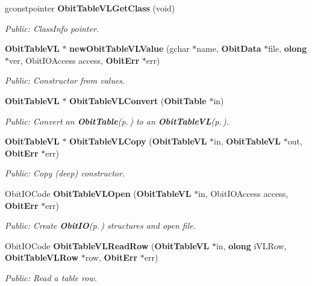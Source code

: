 \begin{CompactItemize}
gconstpointer {\bf Obit\-Table\-VLGet\-Class} (void)
\begin{CompactList}\small\item\em Public: Class\-Info pointer. \item\end{CompactList}\item 
{\bf Obit\-Table\-VL} $\ast$ {\bf new\-Obit\-Table\-VLValue} (gchar $\ast$name, {\bf Obit\-Data} $\ast$file, {\bf olong} $\ast$ver, Obit\-IOAccess access, {\bf Obit\-Err} $\ast$err)
\begin{CompactList}\small\item\em Public: Constructor from values. \item\end{CompactList}\item 
{\bf Obit\-Table\-VL} $\ast$ {\bf Obit\-Table\-VLConvert} ({\bf Obit\-Table} $\ast$in)
\begin{CompactList}\small\item\em Public: Convert an {\bf Obit\-Table}{\rm (p.\,\pageref{structObitTable})} to an {\bf Obit\-Table\-VL}{\rm (p.\,\pageref{structObitTableVL})}. \item\end{CompactList}\item 
{\bf Obit\-Table\-VL} $\ast$ {\bf Obit\-Table\-VLCopy} ({\bf Obit\-Table\-VL} $\ast$in, {\bf Obit\-Table\-VL} $\ast$out, {\bf Obit\-Err} $\ast$err)
\begin{CompactList}\small\item\em Public: Copy (deep) constructor. \item\end{CompactList}\item 
Obit\-IOCode {\bf Obit\-Table\-VLOpen} ({\bf Obit\-Table\-VL} $\ast$in, Obit\-IOAccess access, {\bf Obit\-Err} $\ast$err)
\begin{CompactList}\small\item\em Public: Create {\bf Obit\-IO}{\rm (p.\,\pageref{structObitIO})} structures and open file. \item\end{CompactList}\item 
Obit\-IOCode {\bf Obit\-Table\-VLRead\-Row} ({\bf Obit\-Table\-VL} $\ast$in, {\bf olong} i\-VLRow, {\bf Obit\-Table\-VLRow} $\ast$row, {\bf Obit\-Err} $\ast$err)
\begin{CompactList}\small\item\em Public: Read a table row. \item\end{CompactList}\item 

\end{CompactItemize}
